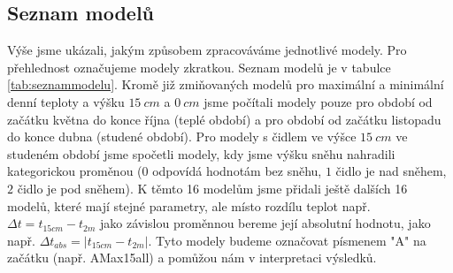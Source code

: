 \subsection{Seznam modelů}
Výše jsme ukázali, jakým způsobem zpracováváme jednotlivé modely. Pro přehlednost označujeme modely zkratkou. Seznam modelů je v tabulce \ref{tab:seznammodelu}. Kromě již zmiňovaných modelů pro maximální a minimální denní teploty a výšku $\SI{15}{cm}$ a $\SI{0}{cm}$ jsme počítali modely pouze pro období od začátku května do konce října (teplé období) a pro období od začátku listopadu do konce dubna (studené období). Pro modely s čidlem ve výšce $\SI{15}{cm}$ ve studeném období jsme spočetli modely, kdy jsme výšku sněhu nahradili kategorickou proměnou ($0$ odpovídá hodnotám bez sněhu, $1$ čidlo je nad sněhem, $2$ čidlo je pod sněhem). K těmto 16 modelům jsme přidali ještě dalších 16 modelů, které mají stejné parametry, ale místo rozdílu teplot např. $\Delta t = t_{15cm} - t_{2m}$ jako závislou proměnnou bereme její absolutní hodnotu, jako např. $\Delta t_{abs} = \left|t_{15cm} - t_{2m}\right|$. Tyto modely budeme označovat písmenem "A" na začátku (např. AMax15all) a pomůžou nám v interpretaci výsledků.

